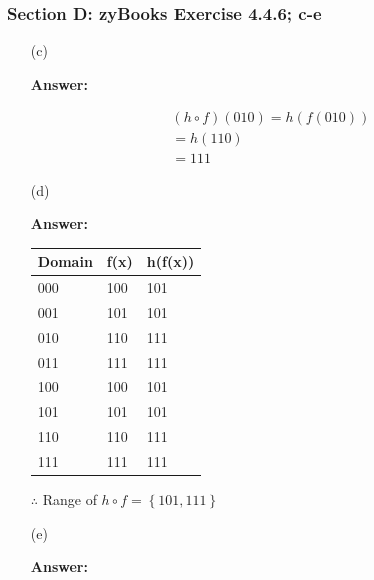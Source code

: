 \documentclass[14pt]{extreport}
\newcommand{\answer}[0]{\medskip \textbf{Answer:} \medskip}
\begin{document}
\subsubsection*{Section D: zyBooks Exercise 4.4.6; c-e}
	
\begin{enumerate}
    \item[(c)]
    
        \answer

        \begin{align*}
            \left ( h \circ f \right )\left ( 010 \right ) = h\left ( f\left ( 010 \right ) \right ) \\
            = h(110) \\
            = 111
        \end{align*}

    \item[(d)]
    
        \answer

        \begin{table}[h]
            \hspace{20mm}
            \begin{tabular}{lll}
            Domain & f(x) & h(f(x)) \\ \hline
            000    & 100  & 101     \\
            001    & 101  & 101     \\
            010    & 110  & 111     \\
            011    & 111  & 111     \\
            100    & 100  & 101     \\
            101    & 101  & 101     \\
            110    & 110  & 111     \\
            111    & 111  & 111    
            \end{tabular}
        \end{table}

        $\therefore$ Range of $h \circ f = \left \{ 101, 111 \right \}$

    \item[(e)]
    
        \answer
    

\end{enumerate}
\end{document}
